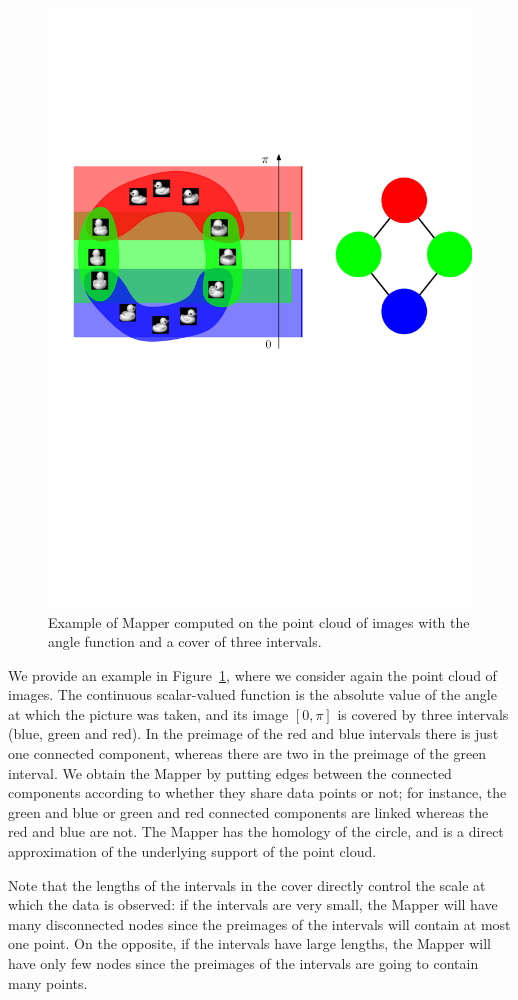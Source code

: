 \begin{figure}[h]\centering
\includegraphics[width=.75\textwidth]{figures/ExampleMapper}
\caption[Mapper on images]{\label{fig:mapper}Example of Mapper computed on the point cloud of images with the angle function and a cover of three intervals.}
\end{figure}	

We provide an example in Figure~\ref{fig:mapper}, where we consider again the point cloud of images. The continuous scalar-valued function is 
the absolute value of the angle at which the picture was taken, and its image $[0,\pi]$ is covered by three intervals (blue, green and red). 
In the preimage of the red and blue intervals there is just one connected component, whereas there are two in the preimage of the green interval.
We obtain the Mapper by putting edges between the connected components according to whether they share data points or not; for instance, 
the green and blue or green and red connected components are linked whereas the red and blue are not. The Mapper has the homology of the circle, and is a 
direct approximation of the underlying support of the point cloud. 

Note that the lengths of the intervals in the cover directly control the scale at which the data is observed: if the intervals are very small, the Mapper
will have many disconnected nodes since the preimages of the intervals will contain at most one point. 
On the opposite, if the intervals have large lengths,
the Mapper will have only few nodes since the preimages of the intervals are going to contain many points.  

